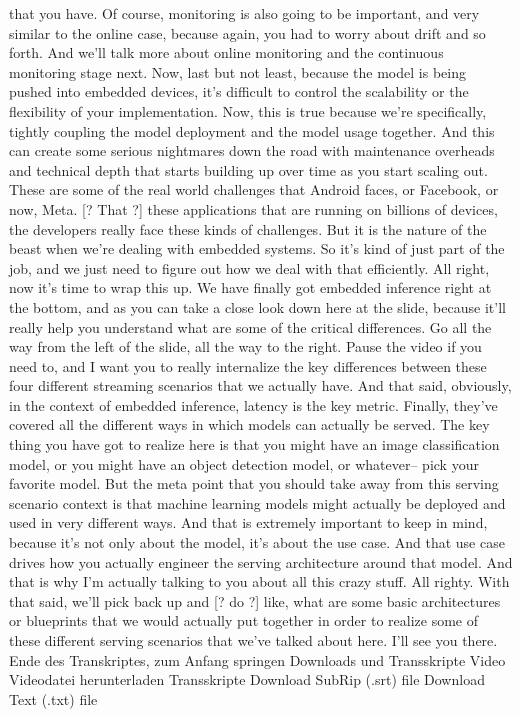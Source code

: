 {{{{{{{    that you have.
    Of course, monitoring is also going to be important, and very similar
    to the online case, because again, you had to worry about drift and so forth.
    And we'll talk more about online monitoring
    and the continuous monitoring stage next.
    Now, last but not least, because the model
    is being pushed into embedded devices, it's
    difficult to control the scalability or the flexibility of your implementation.
    Now, this is true because we're specifically, tightly
    coupling the model deployment and the model usage together.
    And this can create some serious nightmares down the road
    with maintenance overheads and technical depth that starts building up over time
    as you start scaling out.
    These are some of the real world challenges that Android faces,
    or Facebook, or now, Meta.
    [? That ?] these applications that are running
    on billions of devices, the developers really face these kinds of challenges.
    But it is the nature of the beast when we're dealing with embedded systems.
    So it's kind of just part of the job, and we just
    need to figure out how we deal with that efficiently.
    All right, now it's time to wrap this up.
    We have finally got embedded inference right at the bottom,
    and as you can take a close look down here at the slide,
    because it'll really help you understand what
    are some of the critical differences.
    Go all the way from the left of the slide, all the way to the right.
    Pause the video if you need to, and I want you to really internalize
    the key differences between these four different streaming scenarios
    that we actually have.
    And that said, obviously, in the context of embedded inference,
    latency is the key metric.
    Finally, they've covered all the different ways
    in which models can actually be served.
    The key thing you have got to realize here
    is that you might have an image classification model,
    or you might have an object detection model,
    or whatever-- pick your favorite model.
    But the meta point that you should take away from this serving scenario context
    is that machine learning models might actually be deployed and used
    in very different ways.
    And that is extremely important to keep in mind,
    because it's not only about the model, it's about the use case.
    And that use case drives how you actually
    engineer the serving architecture around that model.
    And that is why I'm actually talking to you about all this crazy stuff.
    All righty.
    With that said, we'll pick back up and [? do ?] like,
    what are some basic architectures or blueprints
    that we would actually put together in order
    to realize some of these different serving scenarios
    that we've talked about here.
    I'll see you there.
    Ende des Transkriptes, zum Anfang springen
    Downloads und Transskripte
    Video
    Videodatei herunterladen
    Transskripte
    Download SubRip (.srt) file
    Download Text (.txt) file
  
}}}}}}}
